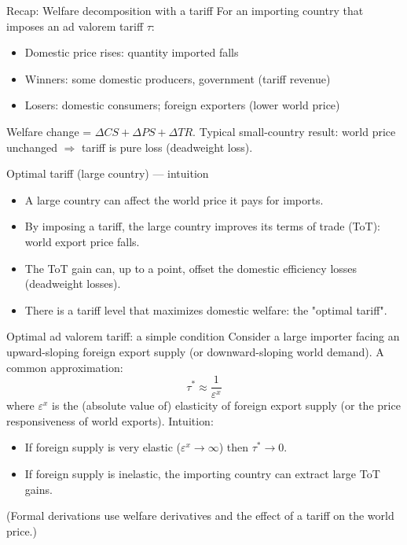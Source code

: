 \documentclass[notes,11pt, aspectratio=169, xcolor=table]{beamer}
\begin{document}

\begin{frame}{Recap: Welfare decomposition with a tariff}
  For an importing country that imposes an ad valorem tariff $\tau$:
  \begin{itemize}
    \item Domestic price rises: quantity imported falls
    \item Winners: some domestic producers, government (tariff revenue)
    \item Losers: domestic consumers; foreign exporters (lower world price)
  \end{itemize}
  Welfare change = $\Delta CS + \Delta PS + \Delta TR$.
  Typical small-country result: world price unchanged $\Rightarrow$ tariff is pure loss (deadweight loss).
\end{frame}

\begin{frame}{Optimal tariff (large country) --- intuition}
  \begin{itemize}
    \item A large country can affect the world price it pays for imports.
    \item By imposing a tariff, the large country improves its terms of trade (ToT): world export price falls.
    \item The ToT gain can, up to a point, offset the domestic efficiency losses (deadweight losses).
    \item There is a tariff level that maximizes domestic welfare: the "optimal tariff".
  \end{itemize}
\end{frame}

\begin{frame}{Optimal ad valorem tariff: a simple condition}
  Consider a large importer facing an upward-sloping foreign export supply (or downward-sloping world demand). A common approximation:
  \[\tau^{*} \approx \frac{1}{\varepsilon^{x}}\]
  where $\varepsilon^{x}$ is the (absolute value of) elasticity of foreign export supply (or the price responsiveness of world exports). Intuition:
  \begin{itemize}
    \item If foreign supply is very elastic ($\varepsilon^{x}\to\infty$) then $\tau^{*}\to 0$.
    \item If foreign supply is inelastic, the importing country can extract large ToT gains.
  \end{itemize}
  (Formal derivations use welfare derivatives and the effect of a tariff on the world price.)
\end{frame}
\end{document}
